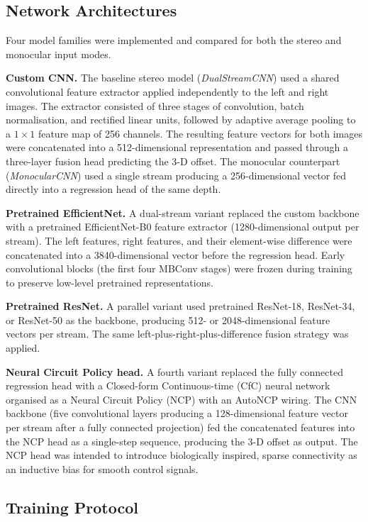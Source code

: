 \documentclass[lettersize,journal]{IEEEtran}
\begin{document}
\subsection{Network Architectures}

Four model families were implemented and compared for both the stereo and
monocular input modes.

\textbf{Custom CNN.}
The baseline stereo model (\emph{DualStreamCNN}) used a shared
convolutional feature extractor applied independently to the left and right
images.  The extractor consisted of three stages of convolution, batch
normalisation, and rectified linear units, followed by adaptive average
pooling to a $1\times1$ feature map of 256 channels.  The resulting feature
vectors for both images were concatenated into a 512-dimensional
representation and passed through a three-layer fusion head predicting the
3-D offset.  The monocular counterpart (\emph{MonocularCNN}) used a single
stream producing a 256-dimensional vector fed directly into a regression
head of the same depth.

\textbf{Pretrained EfficientNet.}
A dual-stream variant replaced the custom backbone with a pretrained
EfficientNet-B0 feature extractor (1280-dimensional output per stream).
The left features, right features, and their element-wise difference were
concatenated into a 3840-dimensional vector before the regression head.
Early convolutional blocks (the first four MBConv stages) were frozen
during training to preserve low-level pretrained representations.

\textbf{Pretrained ResNet.}
A parallel variant used pretrained ResNet-18, ResNet-34, or ResNet-50 as
the backbone, producing 512- or 2048-dimensional feature vectors per
stream.  The same left-plus-right-plus-difference fusion strategy was
applied.

\textbf{Neural Circuit Policy head.}
A fourth variant replaced the fully connected regression head with a
Closed-form Continuous-time (CfC) neural network organised as a Neural
Circuit Policy (NCP) with an AutoNCP wiring.  The CNN backbone (five
convolutional layers producing a 128-dimensional feature vector per stream
after a fully connected projection) fed the concatenated features into the
NCP head as a single-step sequence, producing the 3-D offset as output.
The NCP head was intended to introduce biologically inspired, sparse
connectivity as an inductive bias for smooth control signals.

\subsection{Training Protocol}
\end{document}
